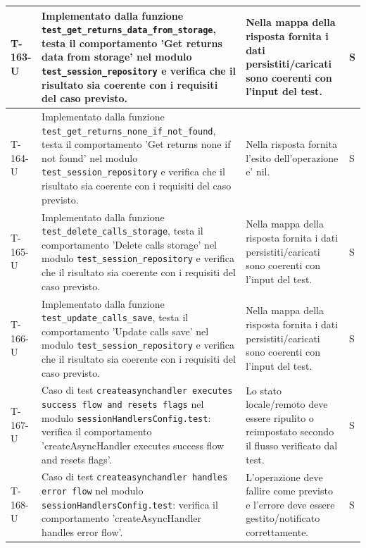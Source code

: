 \documentclass[a4paper,12pt]{article}
\begin{document}
{{\begin{longtable}{|>{\RaggedRight\arraybackslash}p{1.55cm}|>{\RaggedRight\arraybackslash}p{8.0cm}|>{\RaggedRight\arraybackslash}p{4.6cm}|>{\RaggedRight\arraybackslash}p{1.2cm}|}
        \hline
        T-163-U & Implementato dalla funzione \texttt{test\_\allowbreak get\_\allowbreak returns\_\allowbreak data\_\allowbreak from\_\allowbreak storage}, testa il comportamento 'Get returns data from storage' nel modulo \texttt{test\_\allowbreak session\_\allowbreak repository} e verifica che il risultato sia coerente con i requisiti del caso previsto. & Nella mappa della risposta fornita i dati persistiti/caricati sono coerenti con l'input del test. & S \\
        \hline
        T-164-U & Implementato dalla funzione \texttt{test\_\allowbreak get\_\allowbreak returns\_\allowbreak none\_\allowbreak if\_\allowbreak not\_\allowbreak found}, testa il comportamento 'Get returns none if not found' nel modulo \texttt{test\_\allowbreak session\_\allowbreak repository} e verifica che il risultato sia coerente con i requisiti del caso previsto. & Nella risposta fornita l'esito dell'operazione e' nil. & S \\
        \hline
        T-165-U & Implementato dalla funzione \texttt{test\_\allowbreak delete\_\allowbreak calls\_\allowbreak storage}, testa il comportamento 'Delete calls storage' nel modulo \texttt{test\_\allowbreak session\_\allowbreak repository} e verifica che il risultato sia coerente con i requisiti del caso previsto. & Nella mappa della risposta fornita i dati persistiti/caricati sono coerenti con l'input del test. & S \\
        \hline
        T-166-U & Implementato dalla funzione \texttt{test\_\allowbreak update\_\allowbreak calls\_\allowbreak save}, testa il comportamento 'Update calls save' nel modulo \texttt{test\_\allowbreak session\_\allowbreak repository} e verifica che il risultato sia coerente con i requisiti del caso previsto. & Nella mappa della risposta fornita i dati persistiti/caricati sono coerenti con l'input del test. & S \\
        \hline
        T-167-U & Caso di test \texttt{createasynchandler executes success flow and resets flags} nel modulo \texttt{sessionHandlersConfig.test}: verifica il comportamento 'createAsyncHandler executes success flow and resets flags'. & Lo stato locale/remoto deve essere ripulito o reimpostato secondo il flusso verificato dal test. & S \\
        \hline
        T-168-U & Caso di test \texttt{createasynchandler handles error flow} nel modulo \texttt{sessionHandlersConfig.test}: verifica il comportamento 'createAsyncHandler handles error flow'. & L'operazione deve fallire come previsto e l'errore deve essere gestito/notificato correttamente. & S \\

\end{longtable}}}
\end{document}
